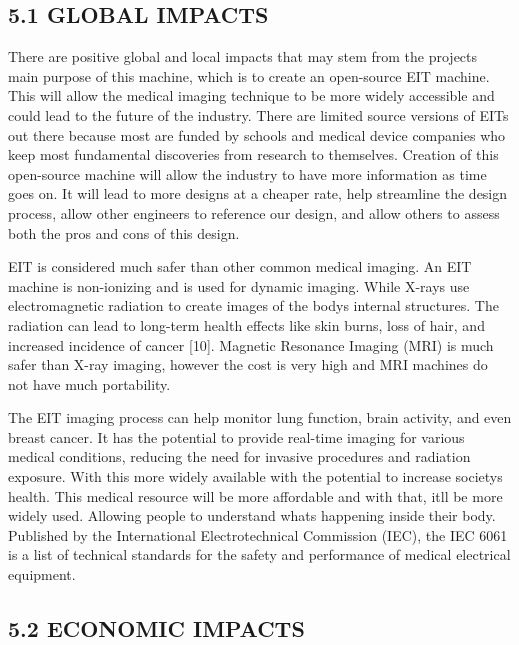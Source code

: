 \subsection*{5.1 GLOBAL IMPACTS~}\label{global-impacts}

There are positive global and local impacts that may stem from the
project\textquotesingle s main purpose of this machine, which is to
create an open-source EIT machine. This will allow the medical imaging
technique to be more widely accessible and could lead to the future of
the industry. There are limited source versions of EITs out there
because most are funded by schools and medical device companies who keep
most fundamental discoveries from research to themselves. Creation of
this open-source machine will allow the industry to have more
information as time goes on. It will lead to more designs at a cheaper
rate, help streamline the design process, allow other engineers to
reference our design, and allow others to assess both the pros and cons
of this design.

EIT is considered much safer than other common medical imaging. An EIT
machine is non-ionizing and is used for dynamic imaging. While X-rays
use electromagnetic radiation to create images of the
body\textquotesingle s internal structures. The radiation can lead to
long-term health effects like skin burns, loss of hair, and increased
incidence of cancer {[}10{]}. Magnetic Resonance Imaging (MRI) is much
safer than X-ray imaging, however the cost is very high and MRI machines
do not have much portability.

The EIT imaging process can help monitor lung function, brain activity,
and even breast cancer. It has the potential to provide real-time
imaging for various medical conditions, reducing the need for invasive
procedures and radiation exposure. With this more widely available with
the potential to increase society\textquotesingle s health. This medical
resource will be more affordable and with that, it\textquotesingle ll be
more widely used. Allowing people to understand what\textquotesingle s
happening inside their body. Published by the International
Electrotechnical Commission (IEC), the IEC 6061 is a list of technical
standards for the safety and performance of medical electrical
equipment.

\subsection*{5.2 ECONOMIC IMPACTS~}\label{economic-impacts}

